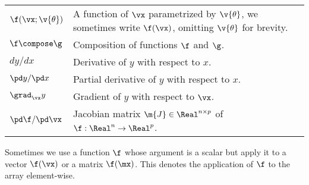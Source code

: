 \begin{tabular}{p{2.0cm}|p{15cm}}
\\
$\f(\vx; \v{\theta})$ & A function of $\vx$ parametrized by $\v{\theta}$, we sometimes write $\f(\vx)$, omitting $\v{\theta}$ for brevity. \\
$\f \compose \g$ & Composition of functions $\f$ and $\g$. \\
$dy / dx$ & Derivative of $y$ with respect to $x$. \\
$\pd y / \pd x$ & Partial derivative of $y$ with respect to $x$. \\
$\grad_{\vx} y$ & Gradient of $y$ with respect to $\vx$. \\
$\pd \f / \pd \vx$ & Jacobian matrix $\m{J} \in \Real^{n \times p}$ of $\f : \Real^n \to \Real^p$.
\end{tabular}
\renewcommand{\arraystretch}{1}

\vspace{0.2cm}

Sometimes we use a function $\f$ whose argument is a scalar but apply it to a vector $\f(\vx)$ or a matrix $\f(\mx)$. This denotes the application of $\f$ to the array element-wise. 
